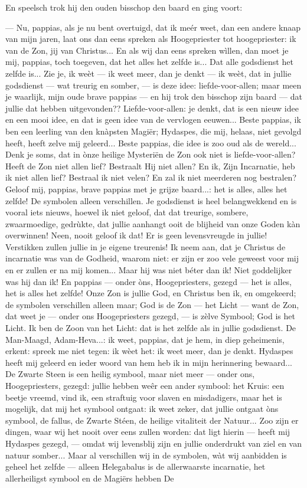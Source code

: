 \documentclass[a4paper, 12pt, oneside, dutch]{article}
\begin{document}
En speelsch trok hij den ouden bisschop den baard en ging voort:

--- Nu, pappias, als je nu bent overtuigd, dat ik meér weet, dan een andere knaap van mijn jaren, laat ons dan eens spreken als Hoogepriester tot hoogepriester: ik van de Zon, jij van Christus... En als wij dan eens spreken wìllen, dan moet je mij, pappias, toch toegeven, dat het alles het zelfde is... Dat alle godsdienst het zelfde is... Zie je, ik weèt --- ik weet meer, dan je denkt --- ik weèt, dat in jullie godsdienst --- wat treurig en somber, --- is deze idee: liefde-voor-allen; maar meen je waarlijk, mijn oude brave pappias --- en hij trok den bisschop zijn baard --- dat jullie dat hebben uitgevonden?? Liefde-voor-allen: je denkt, dat is een nieuw idee en een mooi idee, en dat is geen idee van de vervlogen eeuwen... Beste pappias, ik ben een leerling van den knàpsten Magiër; Hydaspes, die mij, helaas, niet gevolgd heeft, heeft zelve mij geleerd... Beste pappias, die idee is zoo oud als de wereld... Denk je soms, dat in ònze heilige Mysteriën de Zon ook niet is liefde-voor-allen? Heeft de Zon niet allen lief? Bestraalt Hij niet allen? En ik, Zijn Incarnatie, heb ik niet allen lief? Bestraal ik niet velen? En zal ik niet meerderen nog bestralen? Geloof mij, pappias, brave pappias met je grijze baard...: het is alles, alles het zelfde! De symbolen alleen verschillen. Je godsdienst is heel belangwekkend en is vooral iets nieuws, hoewel ik niet geloof, dat dat treurige, sombere, zwaarmoedige, gedrùkte, dat jullie aanhangt ooit de blijheid van onze Goden kàn overwinnen! Neen, nooit geloof ik dat! Er is geen levensvreugde in jullie! Verstikken zullen jullie in je eigene treurenis! Ik neem aan, dat je Christus de incarnatie was van de Godheid, waarom niet: er zijn er zoo vele geweest voor mij en er zullen er na mij komen... Maar hij was niet béter dan ik! Niet goddelijker was hij dan ik! En pappias --- onder òns, Hoogepriesters, gezegd --- het is alles, het is alles het zelfde! Onze Zon is jullie God, en Christus ben ik, en omgekeerd; de symbolen verschillen alleen maar; God is de Zon --- het Licht --- want de Zon, dat weet je --- onder ons Hoogepriesters gezegd, --- is zèlve Symbool; God is het Licht. Ik ben de Zoon van het Licht: dat is het zelfde als in jullie godsdienst. De Man-Maagd, Adam-Heva...: ik weet, pappias, dat je hem, in diep geheimenis, erkent: spreek me niet tegen: ik wèet het: ik weet meer, dan je denkt. Hydaspes heeft mij geleerd en ieder woord van hem heb ik in mijn herinnering bewaard... De Zwarte Steen is een heilig symbool, maar niet meer --- onder ons, Hoogepriesters, gezegd: jullie hebben weêr een ander symbool: het Kruis: een beetje vreemd, vind ik, een straftuig voor slaven en misdadigers, maar het is mogelijk, dat mij het symbool ontgaat: ik weet zeker, dat jullie ontgaat òns symbool, de fallus, de Zwarte Stéen, de heilige vitaliteit der Natuur... Zoo zijn er dingen, waar wij het nooit over eens zullen worden: dat ligt hierin --- heeft mij Hydaspes gezegd, --- omdat wij levensblij zijn en jullie onderdrukt van ziel en van natuur somber... Maar al verschillen wij in de symbolen, wàt wij aanbidden is geheel het zelfde --- alleen Helegabalus is de allerwaarste incarnatie, het allerheiligst symbool en de Magiërs hebben De 
\end{document}
